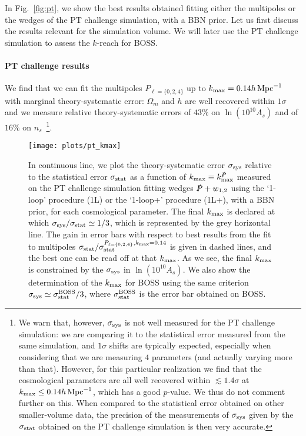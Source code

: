 \documentclass[12pt,a4paper]{article}
\def\hinvMpc{h\,{\rm Mpc}^{-1}}
\def\PA{\slashed{P}}
\renewcommand{\(}{\left(}
\renewcommand{\)}{\right)}
\newcommand{\kmax}{k_{\rm max }}
\begin{document}
{In Fig.~\ref{fig:pt}, we show the best results obtained fitting either the multipoles or the wedges of the PT challenge simulation, {with a BBN prior}. 
Let us first discuss the results relevant for the simulation volume. 
We will later use the PT challenge simulation to assess the $k$-reach for BOSS. 

\paragraph{PT challenge results} We find that we can fit the multipoles $P_{\ell=\{0,2,4\}}$ up to $\kmax = 0.14 \hinvMpc$ with marginal theory-systematic error: $\Omega_m$ and $h$ are well recovered within $1\sigma$ and we measure relative theory-systematic errors of $43\%$ on $\ln (10^{10} A_s)$ and of $16\%$ on $n_s$~\footnote{We warn that, however, $\sigma_{\rm sys}$ is not well measured for the PT challenge simulation: we are comparing it to the statistical error measured from the same simulation, and $1\sigma$ shifts are typically {expected}, especially when considering that we are measuring $4$ parameters (and actually varying more than that). 
However, for this particular realization we find that the cosmological parameters are all well recovered within $\lesssim 1.4\sigma$ at $k_{\rm max} \leq  0.14 \hinvMpc$, which has a good $p$-value. We thus do not comment further on this. 
When compared to the statistical error obtained on other smaller-volume data, the precision of the measurements of $\sigma_{\rm sys}$ given by the $\sigma_{\rm stat}$ obtained on the PT challenge simulation is then very accurate.  }.

\begin{figure}[ht!]
\texttt{[image: plots/pt\_kmax]}
\caption{\small In continuous line, we plot the theory-systematic error $\sigma_{\rm sys}$ relative to the statistical error $\sigma_{\rm stat}$ as a function of $k_{\rm max} \equiv k_{\rm max}^{\PA}$ measured on the PT challenge simulation fitting wedges $\PA + w_{1,2}$ using the `1-loop' procedure (1L) or the `1-loop+' procedure (1L+), with a BBN prior, for each cosmological parameter. 
The final $k_{\rm max}$ is declared at which $\sigma_{\rm sys}/\sigma_{\rm stat} \simeq 1/3$, which is represented by the grey horizontal line. 
The gain in error bars with respect to best results from the fit to multipoles $\sigma_{\rm stat}/\sigma_{\rm stat}^{P_{\ell=\{0,2,4\}}, k_{\rm max}=0.14}$ is given in dashed lines, and the best one can be read off at that $k_{\rm max}$. 
As we see, the final $k_{\rm max}$ is constrained by the $\sigma_{\rm sys}$ in $\ln(10^{10}A_s)$. 
We also show the determination of the $k_{\rm max}$ for BOSS using the same criterion $\sigma_{\rm sys} \simeq \sigma_{\rm stat}^{\rm BOSS}/3$, where $ \sigma_{\rm stat}^{\rm BOSS}$ is the error bar obtained on BOSS. 
 } \label{fig:kmax} 
\end{figure}


}
\end{document}
